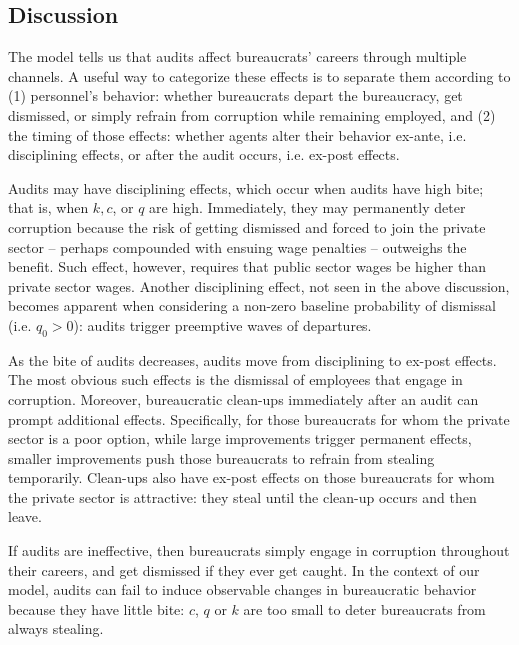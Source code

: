 \documentclass[12pt,a4paper]{article}
\theoremstyle{definition}
\begin{document}
{\subsection{Discussion} 

The model tells us that audits affect bureaucrats' careers through multiple channels. A useful way to categorize these effects is to separate them according to (1) personnel's behavior: whether bureaucrats depart the bureaucracy, get dismissed, or simply refrain from corruption while remaining employed, and (2) the timing of those effects: whether agents alter their behavior ex-ante, i.e. disciplining effects, or after the audit occurs, i.e. ex-post effects. 

Audits may have disciplining effects, which occur when audits have high bite; that is, when $k, c$, or $q$ are high. Immediately, they may permanently deter corruption because the risk of getting dismissed and forced to join the private sector -- perhaps compounded with ensuing wage penalties -- outweighs the benefit. Such effect, however, requires that public sector wages be higher than private sector wages. Another disciplining effect, not seen in the above discussion, becomes apparent when considering a non-zero baseline probability of dismissal (i.e. $q_0 > 0$): audits trigger preemptive waves of departures.  

As the bite of audits decreases, audits move from disciplining to ex-post effects. The most obvious such effects is the dismissal of employees that engage in corruption. Moreover, bureaucratic clean-ups immediately after an audit can prompt additional effects. Specifically, for those bureaucrats for whom the private sector is a poor option, while large improvements trigger permanent effects, smaller improvements push those bureaucrats to refrain from stealing temporarily. Clean-ups also have ex-post effects on those bureaucrats for whom the private sector is attractive: they steal until the clean-up occurs and then leave.

If audits are ineffective, then bureaucrats simply engage in corruption throughout their careers, and get dismissed if they ever get caught. In the context of our model, audits can fail to induce observable changes in bureaucratic behavior because they have little bite: $c$, $q$ or $k$ are too small to deter bureaucrats from always stealing. 

}
\end{document}
